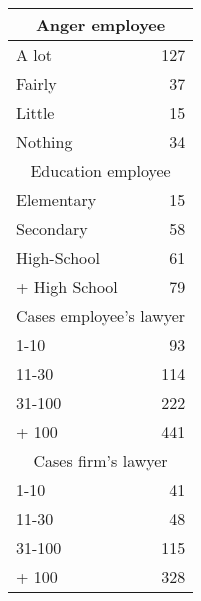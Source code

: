 \begin{tabular}{rr}
\toprule
\multicolumn{2}{c}{Anger employee} \\
\midrule
\midrule
\multicolumn{1}{l}{A lot} & 127 \\
\multicolumn{1}{l}{Fairly} & 37 \\
\multicolumn{1}{l}{Little } & 15 \\
\multicolumn{1}{l}{Nothing} & 34 \\
\midrule
\multicolumn{2}{c}{Education employee} \\
\midrule
\midrule
\multicolumn{1}{l}{Elementary} & 15 \\
\multicolumn{1}{l}{Secondary} & 58 \\
\multicolumn{1}{l}{High-School} & 61 \\
\multicolumn{1}{l}{+ High School} & 79 \\
\midrule
\multicolumn{2}{c}{Cases employee's lawyer} \\
\midrule
\midrule
\multicolumn{1}{l}{1-10} & 93 \\
\multicolumn{1}{l}{11-30} & 114 \\
\multicolumn{1}{l}{31-100} & 222 \\
\multicolumn{1}{l}{+ 100} & 441 \\
\midrule
\multicolumn{2}{c}{Cases firm's lawyer} \\
\midrule
\midrule
\multicolumn{1}{l}{1-10} & 41 \\
\multicolumn{1}{l}{11-30} & 48 \\
\multicolumn{1}{l}{31-100} & 115 \\
\multicolumn{1}{l}{+ 100} & 328 \\
\bottomrule
\end{tabular}%
